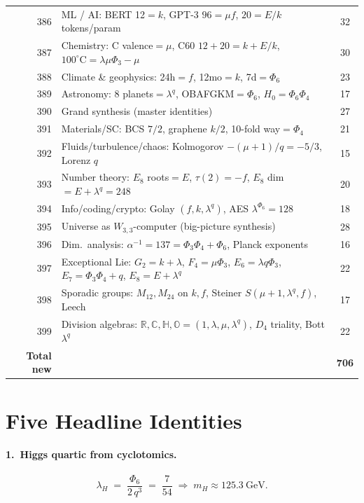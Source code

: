 \documentclass[11pt,a4paper]{article}
\begin{document}
\begin{longtable}{rlc}
386 & ML / AI: BERT 12$=k$, GPT-3 $96=\mu f$, $20=E/k$ tokens/param & 32 \\
387 & Chemistry: C valence$=\mu$, C60 $12{+}20=k{+}E/k$, $100^\circ\mathrm{C}=\lambda\mu\Phi_3-\mu$ & 30 \\
388 & Climate \& geophysics: 24h$=f$, 12mo$=k$, 7d$=\Phi_6$ & 23 \\
389 & Astronomy: 8 planets$=\lambda^q$, OBAFGKM$=\Phi_6$, $H_0=\Phi_6\Phi_4$ & 17 \\
390 & Grand synthesis (master identities) & 27 \\
391 & Materials/SC: BCS $7/2$, graphene $k/2$, 10-fold way$=\Phi_4$ & 21 \\
392 & Fluids/turbulence/chaos: Kolmogorov $-(\mu{+}1)/q=-5/3$, Lorenz $q$ & 15 \\
393 & Number theory: $E_8$ roots$=E$, $\tau(2)=-f$, $E_8$ dim$=E+\lambda^q=248$ & 20 \\
394 & Info/coding/crypto: Golay $(f,k,\lambda^q)$, AES $\lambda^{\Phi_6}=128$ & 18 \\
395 & Universe as $W_{3,3}$-computer (big-picture synthesis) & 28 \\
396 & Dim.\ analysis: $\alpha^{-1}=137=\Phi_3\Phi_4+\Phi_6$, Planck exponents & 16 \\
397 & Exceptional Lie: $G_2{=}k{+}\lambda$, $F_4{=}\mu\Phi_3$, $E_6{=}\lambda q\Phi_3$, $E_7{=}\Phi_3\Phi_4{+}q$, $E_8{=}E{+}\lambda^q$ & 22 \\
398 & Sporadic groups: $M_{12},M_{24}$ on $k,f$, Steiner $S(\mu{+}1,\lambda^q,f)$, Leech & 17 \\
399 & Division algebras: $\mathbb{R},\mathbb{C},\mathbb{H},\mathbb{O}=(1,\lambda,\mu,\lambda^q)$, $D_4$ triality, Bott $\lambda^q$ & 22 \\
\midrule
\textbf{Total new} & & \textbf{706} \\
\bottomrule
\end{longtable}

\section{Five Headline Identities}

\paragraph{1.\ Higgs quartic from cyclotomics.}
\[
\lambda_H \;=\; \frac{\Phi_6}{2\,q^{3}} \;=\; \frac{7}{54}\;\Longrightarrow\;m_H\approx 125.3\ \mathrm{GeV}.
\]
\end{document}

